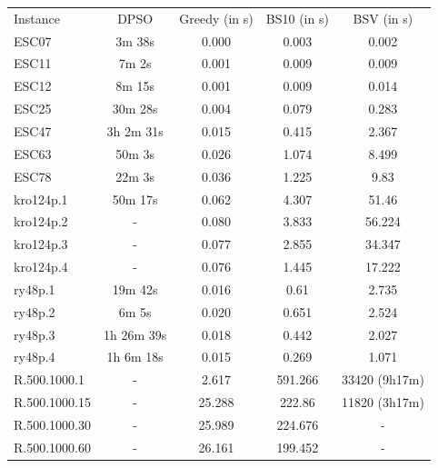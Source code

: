 \documentclass[]{article}
\begin{document}
	\begin{table}[H]
		\begin{tabular}{lcccc}
			Instance      & DPSO           & Greedy (in s) & BS10 (in s) & BSV (in s)    \\
			ESC07         &     3m 38s     & 0.000         & 0.003       & 0.002         \\
			ESC11         &     7m  2s     & 0.001         & 0.009       & 0.009         \\
			ESC12         &     8m 15s     & 0.001         & 0.009       & 0.014         \\
			ESC25         &    30m 28s     & 0.004         & 0.079       & 0.283         \\
			ESC47         & 3h  2m 31s     & 0.015         & 0.415       & 2.367         \\
			ESC63         &    50m  3s     & 0.026         & 1.074       & 8.499         \\
			ESC78         &    22m  3s     & 0.036         & 1.225       & 9.83          \\
			kro124p.1     &    50m 17s     & 0.062         & 4.307       & 51.46         \\
			kro124p.2     & -              & 0.080         & 3.833       & 56.224        \\
			kro124p.3     & -              & 0.077         & 2.855       & 34.347        \\
			kro124p.4     & -              & 0.076         & 1.445       & 17.222        \\
			ry48p.1       &    19m 42s     & 0.016         & 0.61        & 2.735         \\
			ry48p.2       &     6m  5s     & 0.020         & 0.651       & 2.524         \\
			ry48p.3       & 1h 26m 39s     & 0.018         & 0.442       & 2.027         \\
			ry48p.4       & 1h  6m 18s     & 0.015         & 0.269       & 1.071         \\
			R.500.1000.1  & -              & 2.617         & 591.266     & 33420 (9h17m) \\
			R.500.1000.15 & -              & 25.288        & 222.86      & 11820 (3h17m) \\
			R.500.1000.30 & -              & 25.989        & 224.676     & -             \\
			R.500.1000.60 & -              & 26.161        & 199.452     & -             \\

\end{tabular}
\end{table}
\end{document}
